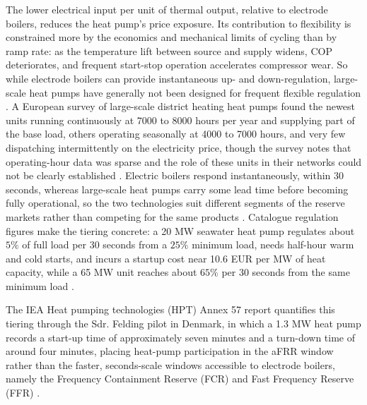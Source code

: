 The lower electrical input per unit of thermal output, relative to electrode boilers, reduces the heat pump's price exposure. Its contribution to flexibility is constrained more by the economics and mechanical limits of cycling than by ramp rate: as the temperature lift between source and supply widens, COP deteriorates, and frequent start-stop operation accelerates compressor wear. So while electrode boilers can provide instantaneous up- and down-regulation, large-scale heat pumps have generally not been designed for frequent flexible regulation \cite{david_heat_2017}. A European survey of large-scale district heating heat pumps found the newest units running continuously at 7000 to 8000 hours per year and supplying part of the base load, others operating seasonally at 4000 to 7000 hours, and very few dispatching intermittently on the electricity price, though the survey notes that operating-hour data was sparse and the role of these units in their networks could not be clearly established \cite{david_heat_2017}. Electric boilers respond instantaneously, within 30 seconds, whereas large-scale heat pumps carry some lead time before becoming fully operational, so the two technologies suit different segments of the reserve markets rather than competing for the same products \cite{monie_power--heat_2022}. Catalogue regulation figures make the tiering concrete: a 20 MW seawater heat pump regulates about $5\%$ of full load per 30 seconds from a $25\%$ minimum load, needs half-hour warm and cold starts, and incurs a startup cost near 10.6 EUR per MW of heat capacity, while a 65 MW unit reaches about $65\%$ per 30 seconds from the same minimum load \cite{danish_energy_agency_technology_2024}.

The IEA Heat pumping technologies (HPT) Annex 57 report quantifies this tiering through the Sdr. Felding pilot in Denmark, in which a 1.3 MW heat pump records a start-up time of approximately seven minutes and a turn-down time of around four minutes, placing heat-pump participation in the aFRR window rather than the faster, seconds-scale windows accessible to electrode boilers, namely the Frequency Containment Reserve (FCR) and Fast Frequency Reserve (FFR) \cite{v_pedersen_annex_2024}.

